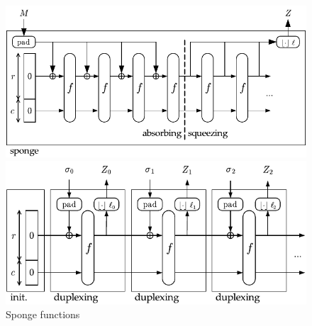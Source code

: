 \begin{figure}
  \begin{minipage}{\textwidth}
    \centering
    \includegraphics[scale=0.8]{images/sponge.pdf}
  \end{minipage}
  \begin{minipage}{\textwidth}
    \centering
    \includegraphics[scale=0.8]{images/duplex.pdf}
  \end{minipage}
  \caption{Sponge functions}
  \label{figure/sponge-functions}
\end{figure}

